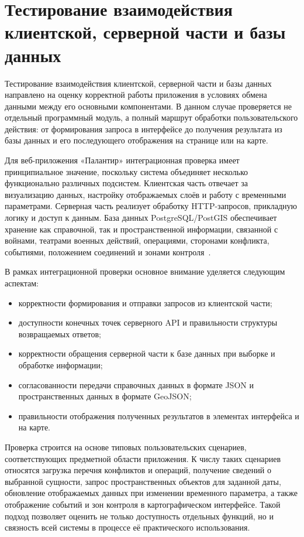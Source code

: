 \section{Тестирование взаимодействия клиентской, серверной части и базы данных}

Тестирование взаимодействия клиентской, серверной части и базы данных направлено на оценку корректной работы приложения в условиях обмена данными между его основными компонентами. В данном случае проверяется не отдельный программный модуль, а полный маршрут обработки пользовательского действия: от формирования запроса в интерфейсе до получения результата из базы данных и его последующего отображения на странице или на карте.

Для веб-приложения «Палантир» интеграционная проверка имеет принципиальное значение, поскольку система объединяет несколько функционально различных подсистем. Клиентская часть отвечает за визуализацию данных, настройку отображаемых слоёв и работу с временными параметрами. Серверная часть реализует обработку HTTP-запросов, прикладную логику и доступ к данным. База данных PostgreSQL/PostGIS обеспечивает хранение как справочной, так и пространственной информации, связанной с войнами, театрами военных действий, операциями, сторонами конфликта, событиями, положением соединений и зонами контроля~\cite{postgresql_docs,postgis_manual}.

В рамках интеграционной проверки основное внимание уделяется следующим аспектам:
\begin{itemize}
\item корректности формирования и отправки запросов из клиентской части;
\item доступности конечных точек серверного API и правильности структуры возвращаемых ответов;
\item корректности обращения серверной части к базе данных при выборке и обработке информации;
\item согласованности передачи справочных данных в формате JSON и пространственных данных в формате GeoJSON;
\item правильности отображения полученных результатов в элементах интерфейса и на карте.
\end{itemize}

Проверка строится на основе типовых пользовательских сценариев, соответствующих предметной области приложения. К числу таких сценариев относятся загрузка перечня конфликтов и операций, получение сведений о выбранной сущности, запрос пространственных объектов для заданной даты, обновление отображаемых данных при изменении временного параметра, а также отображение событий и зон контроля в картографическом интерфейсе. Такой подход позволяет оценить не только доступность отдельных функций, но и связность всей системы в процессе её практического использования.

